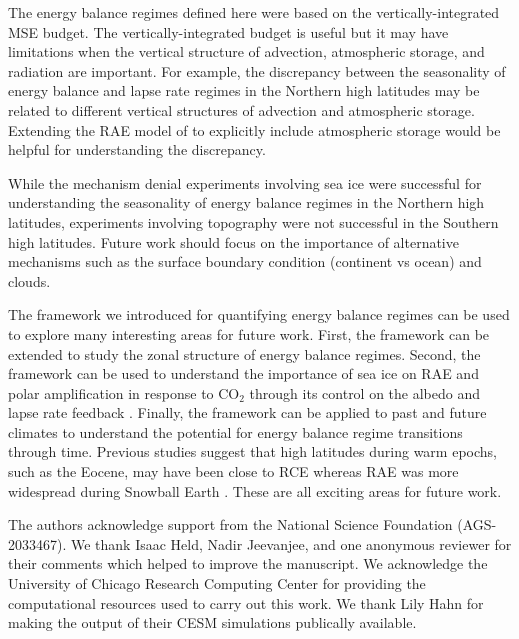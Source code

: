\documentclass{ametsocV5}
\begin{document}
The energy balance regimes defined here were based on the vertically-integrated MSE budget. The vertically-integrated budget is useful but it may have limitations when the vertical structure of advection, atmospheric storage, and radiation are important. For example, the discrepancy between the seasonality of energy balance and lapse rate regimes in the Northern high latitudes may be related to different vertical structures of advection and atmospheric storage. Extending the RAE model of \cite{cronin2016} to explicitly include atmospheric storage would be helpful for understanding the discrepancy. 

While the mechanism denial experiments involving sea ice were successful for understanding the seasonality of energy balance regimes in the Northern high latitudes, experiments involving topography were not successful in the Southern high latitudes. Future work should focus on the importance of alternative mechanisms such as the surface boundary condition (continent vs ocean) and clouds.

The framework we introduced for quantifying energy balance regimes can be used to explore many interesting areas for future work. First, the framework can be extended to study the zonal structure of energy balance regimes. Second, the framework can be used to understand the importance of sea ice on RAE and polar amplification in response to CO$_2$ through its control on the albedo and lapse rate feedback \citep{feldl2020}. Finally, the framework can be applied to past and future climates to understand the potential for energy balance regime transitions through time. Previous studies suggest that high latitudes during warm epochs, such as the Eocene, may have been close to RCE \citep{abbot2008a} whereas RAE was more widespread during Snowball Earth \citep{pierrehumbert2005}. These are all exciting areas for future work.

\acknowledgments
The authors acknowledge support from the National Science Foundation (AGS-2033467). We thank Isaac Held, Nadir Jeevanjee, and one anonymous reviewer for their comments which helped to improve the manuscript. We acknowledge the University of Chicago Research Computing Center for providing the computational resources used to carry out this work. We thank Lily Hahn for making the output of their CESM simulations publically available.
\end{document}
